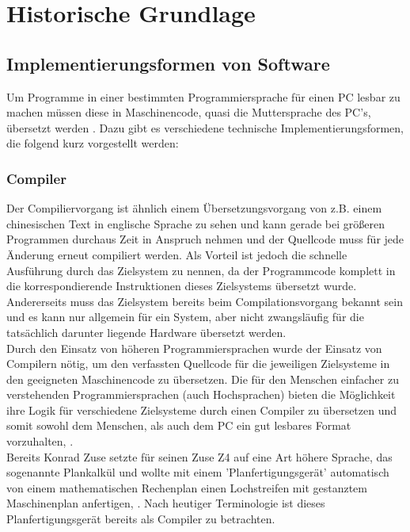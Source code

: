 \chapter{Historische Grundlage} %
\section{Implementierungsformen von Software}
Um Programme in einer bestimmten Programmiersprache für einen \ac{PC} lesbar zu machen müssen diese in Maschinencode, quasi die Muttersprache des \ac{PC}'s, übersetzt werden \cite[vgl. Wagenknecht Hielscher 2022, S.2ff]{wagenknecht_hielscher_2022}. Dazu gibt es verschiedene technische Implementierungsformen, die folgend kurz vorgestellt werden:

\subsection{Compiler}\label{ch_compiler}
Der Compiliervorgang ist ähnlich einem Übersetzungsvorgang von z.B. einem chinesischen Text in englische Sprache zu  sehen und kann gerade bei größeren Programmen durchaus Zeit in Anspruch nehmen und der Quellcode muss für jede Änderung erneut compiliert werden. Als Vorteil ist jedoch die schnelle Ausführung durch das Zielsystem zu nennen, da der Programmcode komplett in die korrespondierende Instruktionen dieses Zielsystems übersetzt wurde. \cite[vgl. Wagenknecht Hielscher, S.121]{wagenknecht_hielscher_2022}
Andererseits muss das Zielsystem bereits beim Compilationsvorgang bekannt sein und es kann nur allgemein für ein System, aber nicht zwangsläufig für die tatsächlich darunter liegende Hardware übersetzt werden. \\
Durch den Einsatz von höheren Programmiersprachen wurde der Einsatz von Compilern nötig, um den verfassten Quellcode für die jeweiligen Zielsysteme in den geeigneten Maschinencode zu übersetzen. Die für den Menschen einfacher zu verstehenden Programmiersprachen (auch Hochsprachen) bieten die Möglichkeit ihre Logik für verschiedene Zielsysteme durch einen Compiler zu übersetzen und somit sowohl dem Menschen, als auch dem \ac{PC} ein gut lesbares Format vorzuhalten, \cite[vgl. Wagenknecht Hielscher, S.1ff]{wagenknecht_hielscher_2022}.\\
Bereits Konrad Zuse setzte für seinen Zuse Z4 auf eine Art höhere Sprache, das sogenannte Plankalkül und wollte mit einem 'Planfertigungsgerät' automatisch von einem mathematischen Rechenplan einen Lochstreifen mit gestanztem Maschinenplan anfertigen, \cite[vgl. Heilige 2013, S.45]{Hellige2013}. Nach heutiger Terminologie ist dieses Planfertigungsgerät bereits als Compiler zu betrachten. \\
